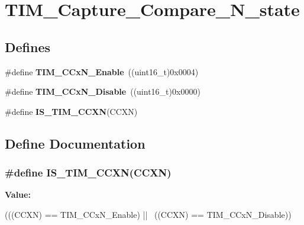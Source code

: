 \hypertarget{group__TIM__Capture__Compare__N__state}{
\section{TIM\_\-Capture\_\-Compare\_\-N\_\-state}
\label{group__TIM__Capture__Compare__N__state}
}
\subsection*{Defines}
\begin{DoxyCompactItemize}
\item 
\hypertarget{group__TIM__Capture__Compare__N__state_gab534ddf23d317eb912564292c1cede2d}{
\#define {\bfseries TIM\_\-CCxN\_\-Enable}~((uint16\_\-t)0x0004)}
\label{group__TIM__Capture__Compare__N__state_gab534ddf23d317eb912564292c1cede2d}

\item 
\hypertarget{group__TIM__Capture__Compare__N__state_ga0d7d46aeba33ed197aa39775bc527d7d}{
\#define {\bfseries TIM\_\-CCxN\_\-Disable}~((uint16\_\-t)0x0000)}
\label{group__TIM__Capture__Compare__N__state_ga0d7d46aeba33ed197aa39775bc527d7d}

\item 
\#define {\bfseries IS\_\-TIM\_\-CCXN}(CCXN)
\end{DoxyCompactItemize}


\subsection{Define Documentation}
\hypertarget{group__TIM__Capture__Compare__N__state_gad5a9f961e44c8d7c24066ac37ec79cbc}{
\subsubsection[{IS\_\-TIM\_\-CCXN}]{\setlength{\rightskip}{0pt plus 5cm}\#define IS\_\-TIM\_\-CCXN(CCXN)}}
\label{group__TIM__Capture__Compare__N__state_gad5a9f961e44c8d7c24066ac37ec79cbc}
{\bfseries Value:}
\begin{DoxyCode}
(((CCXN) == TIM_CCxN_Enable) || \
                           ((CCXN) == TIM_CCxN_Disable))
\end{DoxyCode}
